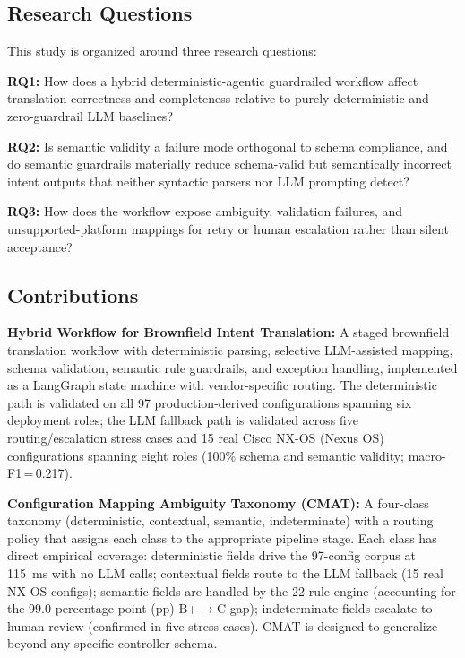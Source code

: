 \documentclass[conference]{IEEEtran}
\begin{document}
\subsection{Research Questions}

This study is organized around three research questions:

\textbf{RQ1:} How does a hybrid deterministic-agentic guardrailed workflow affect translation correctness and completeness relative to purely deterministic and zero-guardrail LLM baselines?

\textbf{RQ2:} Is semantic validity a failure mode orthogonal to schema compliance, and do semantic guardrails materially reduce schema-valid but semantically incorrect intent outputs that neither syntactic parsers nor LLM prompting detect?

\textbf{RQ3:} How does the workflow expose ambiguity, validation failures, and unsupported-platform mappings for retry or human escalation rather than silent acceptance?

\subsection{Contributions}


\textbf{Hybrid Workflow for Brownfield Intent Translation:} A staged brownfield translation workflow with deterministic parsing, selective LLM-assisted mapping, schema validation, semantic rule guardrails, and exception handling, implemented as a LangGraph state machine with vendor-specific routing. The deterministic path is validated on all 97 production-derived configurations spanning six deployment roles; the LLM fallback path is validated across five routing/escalation stress cases and 15 real Cisco NX-OS (Nexus OS) configurations spanning eight roles (100\% schema and semantic validity; macro-F1\,=\,0.217).

\textbf{Configuration Mapping Ambiguity Taxonomy (CMAT):} A four-class taxonomy (deterministic, contextual, semantic, indeterminate) with a routing policy that assigns each class to the appropriate pipeline stage. Each class has direct empirical coverage: deterministic fields drive the 97-config corpus at 115~ms with no LLM calls; contextual fields route to the LLM fallback (15 real NX-OS configs); semantic fields are handled by the 22-rule engine (accounting for the 99.0 percentage-point (pp) B+$\to$C gap); indeterminate fields escalate to human review (confirmed in five stress cases). CMAT is designed to generalize beyond any specific controller schema.
\end{document}
